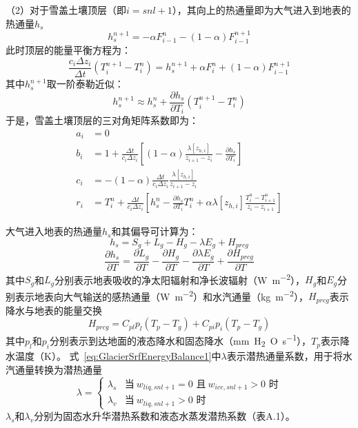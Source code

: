 （2）对于雪盖土壤顶层（即$i=snl+1$），其向上的热通量即为大气进入到地表的热通量$h_s$
\begin{equation}
    h^{n+1}_s=-\alpha F^n_{i-1}-\left(1-\alpha\right)F^{n+1}_{i-1}
\end{equation}
此时顶层的能量平衡方程为：
\begin{equation}
    \frac{c_i\Delta z_i}{\Delta t}\left(T^{n+1}_i-T^n_i\right) = h^{n+1}_s+\alpha F^n_i+\left(1-\alpha \right)F^{n+1}_{i-1}
\end{equation}
其中$h^{n+1}_s$取一阶泰勒近似：
\begin{equation}
    h^{n+1}_s \approx h^n_s + \frac{\partial h_s}{\partial T_i}\left(T^{n+1}_i-T^n_i\right)
\end{equation}
于是，雪盖土壤顶层的三对角矩阵系数即为：
\begin{equation}
\begin{aligned}
    a_{i} &= 0 \\ 
    b_{i} &= 1+\frac{\Delta t}{c_{i} \Delta z_{i}}\left[(1-\alpha) \frac{\lambda\left[z_{h, i}\right]}{z_{i+1}-z_{i}}-\frac{\partial h_{s}}{\partial T_{i}}\right] \\
    c_{i} &= -(1-\alpha) \frac{\Delta t}{c_{i} \Delta z_{i}} \frac{\lambda\left[z_{h, i}\right]}{z_{i+1}-z_{i}} \\
    r_{i} &= T_{i}^{n}+\frac{\Delta t}{c_{i} \Delta z_{i}}\left[h_{s}^{n}-\frac{\partial h_{s}}{\partial T_{i}} T_{i}^{n}+\alpha \lambda\left[z_{h, i}\right] \frac{T_{i}^{n}-T_{i+1}^{n}}{z_{i}-z_{i+1}}\right]
\end{aligned}
\end{equation}

大气进入地表的热通量$h_s$和其偏导可计算为：
\begin{equation}\label{eq:GlacierSrfEnergyBalance1}
    h_s = S_g + L_g - H_g - \lambda E_g + H_{prcg}
\end{equation}
\begin{equation}
    \frac{\partial h_s}{\partial T} = \frac{\partial L_g}{\partial T} -\frac{\partial H_g}{\partial T} -\frac{\partial \lambda E_g}{\partial T} +\frac{\partial H_{prcg}}{\partial T}
\end{equation}
其中$S_g$和$L_g$分别表示地表吸收的净太阳辐射和净长波辐射（\unit{W.m^{-2}}），$H_g$和$E_g$分别表示地表向大气输送的感热通量（\unit{W.m^{-2}}）和水汽通量（\unit{kg.m^{-2}}），$H_{prcg}$表示降水与地表的能量交换
\begin{equation}
    H_{prcg} = C_{pl}p_l\left(T_p-T_g\right) + C_{pi}p_i\left(T_p-T_g\right)
\end{equation}
其中$p_l$和$p_i$分别表示到达地面的液态降水和固态降水（\unit{mm.H_2O.s^{-1}}），$T_p$表示降水温度（K）。
式~\eqref{eq:GlacierSrfEnergyBalance1}中$\lambda$表示潜热通量系数，用于将水汽通量转换为潜热通量
\begin{equation}
    \lambda = \begin{cases}
        \lambda_s &\text{当}\ w_{liq,snl+1}=0\text{ 且}\ w_{ice,snl+1}>0\text{ 时}\\
        \lambda_v &\text{当}\ w_{liq,snl+1}>0\text{ 时}
    \end{cases}
\end{equation}
$\lambda_s$和$\lambda_v$分别为固态水升华潜热系数和液态水蒸发潜热系数（表A.1）。

